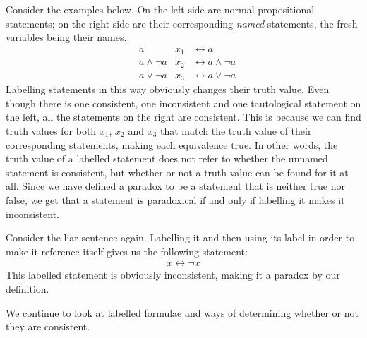 Consider the examples below.
On the left side are normal propositional statements;
on the right side are their corresponding \textit{named} statements, the fresh variables being their names.
\begin{align}
  &a               &x_1 &\leftrightarrow a\\
  &a \wedge \neg a &x_2 &\leftrightarrow a \wedge \neg a\\
  &a \vee \neg a   &x_3 &\leftrightarrow a \vee \neg a
\end{align}
Labelling statements in this way obviously changes their truth value.
Even though there is one consistent, one inconsistent and one tautological statement on the left, all the statements on the right are consistent.
This is because we can find truth values for both $x_1$, $x_2$ and $x_3$ that match the truth value of their corresponding statements, making each equivalence true.
In other words, the truth value of a labelled statement does not refer to whether the unnamed statement is consistent, but whether or not a truth value can be found for it at all.
Since we have defined a paradox to be a statement that is neither true nor false, we get that a statement is paradoxical if and only if labelling it makes it inconsistent.

Consider the liar sentence again.
Labelling it and then using its label in order to make it reference itself gives us the following statement:
\begin{align}
  x \leftrightarrow \neg x
\end{align}
This labelled statement is obviously inconsistent, making it a paradox by our definition.

We continue to look at labelled formulae and ways of determining whether or not they are consistent.
